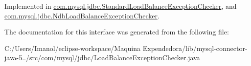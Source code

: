 Implemented in \mbox{\hyperlink{classcom_1_1mysql_1_1jdbc_1_1_standard_load_balance_exception_checker_ae94fdd274579d8507853e5f32e0a948a}{com.\+mysql.\+jdbc.\+Standard\+Load\+Balance\+Exception\+Checker}}, and \mbox{\hyperlink{classcom_1_1mysql_1_1jdbc_1_1_ndb_load_balance_exception_checker_a07072cfa83f0942761b59015dbefc25e}{com.\+mysql.\+jdbc.\+Ndb\+Load\+Balance\+Exception\+Checker}}.



The documentation for this interface was generated from the following file\+:\begin{DoxyCompactItemize}
\item 
C\+:/\+Users/\+Imanol/eclipse-\/workspace/\+Maquina Expendedora/lib/mysql-\/connector-\/java-\/5../src/com/mysql/jdbc/Load\+Balance\+Exception\+Checker.\+java\end{DoxyCompactItemize}
